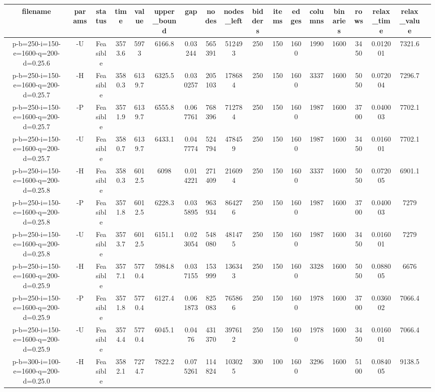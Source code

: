 \documentclass[landscape, a4paper]{article}
\begin{document}
\begin{center}
\begin{tabular}{@{}cccccccccccccccccc@{}}
filename & params & status & time & value & upper\_bound & gap & nodes & nodes\_left & bidders & items & edges & columns & binaries & rows & relax\_time & relax\_value & \\
\hline
p-b=250-i=150-e=1600-q=200-d=0.25.6 & -U & Feasible & 3573.6 & 5973 & 6166.8 & 0.03244 & 565391 & 512493 & 250 & 150 & 1600 & 1990 & 1600 & 3450 & 0.012001 & 7321.6 & \\
p-b=250-i=150-e=1600-q=200-d=0.25.7 & -H & Feasible & 3580.3 & 6139.7 & 6325.5 & 0.030257 & 205103 & 178684 & 250 & 150 & 1600 & 3337 & 1600 & 5050 & 0.072004 & 7296.7 & \\
p-b=250-i=150-e=1600-q=200-d=0.25.7 & -P & Feasible & 3571.9 & 6139.7 & 6555.8 & 0.067761 & 768396 & 712784 & 250 & 150 & 1600 & 1987 & 1600 & 3700 & 0.040003 & 7702.1 & \\
p-b=250-i=150-e=1600-q=200-d=0.25.7 & -U & Feasible & 3580.7 & 6139.7 & 6433.1 & 0.047774 & 524794 & 478459 & 250 & 150 & 1600 & 1987 & 1600 & 3450 & 0.016001 & 7702.1 & \\
p-b=250-i=150-e=1600-q=200-d=0.25.8 & -H & Feasible & 3580.3 & 6012.5 & 6098 & 0.014221 & 271409 & 216094 & 250 & 150 & 1600 & 3337 & 1600 & 5050 & 0.072005 & 6901.1 & \\
p-b=250-i=150-e=1600-q=200-d=0.25.8 & -P & Feasible & 3571.8 & 6012.5 & 6228.3 & 0.035895 & 963934 & 864276 & 250 & 150 & 1600 & 1987 & 1600 & 3700 & 0.040003 & 7279 & \\
p-b=250-i=150-e=1600-q=200-d=0.25.8 & -U & Feasible & 3573.7 & 6012.5 & 6151.1 & 0.023054 & 548080 & 481475 & 250 & 150 & 1600 & 1987 & 1600 & 3450 & 0.016001 & 7279 & \\
p-b=250-i=150-e=1600-q=200-d=0.25.9 & -H & Feasible & 3577.1 & 5770.4 & 5984.8 & 0.037155 & 153999 & 136343 & 250 & 150 & 1600 & 3328 & 1600 & 5050 & 0.088005 & 6676 & \\
p-b=250-i=150-e=1600-q=200-d=0.25.9 & -P & Feasible & 3571.8 & 5770.4 & 6127.4 & 0.061873 & 825083 & 765866 & 250 & 150 & 1600 & 1978 & 1600 & 3700 & 0.036002 & 7066.4 & \\
p-b=250-i=150-e=1600-q=200-d=0.25.9 & -U & Feasible & 3574.4 & 5770.4 & 6045.1 & 0.0476 & 431370 & 397612 & 250 & 150 & 1600 & 1978 & 1600 & 3450 & 0.016001 & 7066.4 & \\
p-b=300-i=100-e=1600-q=200-d=0.25.0 & -H & Feasible & 3582.1 & 7274.7 & 7822.2 & 0.075261 & 114824 & 103025 & 300 & 100 & 1600 & 3296 & 1600 & 5100 & 0.084005 & 9138.5 & \\

\end{tabular}
\end{center}
\end{document}
